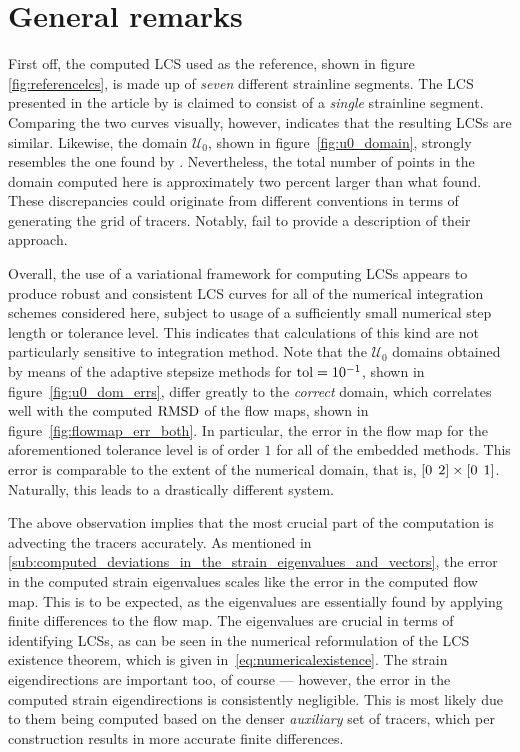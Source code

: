 \section{General remarks}
\label{sec:general_remarks}

First off, the computed LCS used as the reference, shown in figure
\ref{fig:referencelcs}, is made up of \emph{seven} different strainline segments.
The LCS presented in the article by \textcite{farazmand2012computing} is claimed
to consist of a \emph{single} strainline segment. Comparing the two curves
visually, however, indicates that the resulting LCSs are similar. Likewise, the
domain $\mathcal{U}_{0}$, shown in figure~\ref{fig:u0_domain}, strongly
resembles the one found by \citeauthor{farazmand2012computing}. Nevertheless,
the total number of points in the domain computed here is approximately two
percent larger than what \citeauthor{farazmand2012computing} found. These
discrepancies could originate from different conventions in terms of generating
the grid of tracers. Notably, \citeauthor{farazmand2012computing} fail to
provide a description of their approach.

Overall, the use of a variational framework for computing LCSs appears to
produce robust and consistent LCS curves for all of the numerical integration
schemes considered here, subject to usage of a sufficiently small numerical
step length or tolerance level. This indicates that calculations of this kind
are not particularly sensitive to integration method. Note that the
$\mathcal{U}_{0}$ domains obtained by means of the adaptive stepsize methods
for $\textnormal{tol}=10^{-1}$, shown in figure~\ref{fig:u0_dom_errs}, differ
greatly to the \emph{correct} domain, which correlates well with the computed
$\operatorname{RMSD}$ of the flow maps, shown in figure~\ref{fig:flowmap_err_both}. In
particular, the error in the flow map for the aforementioned tolerance level is
of order $1$ for all of the embedded methods. This error is comparable to the
extent of the numerical domain, that is,
$[0\hspace{1ex}2]\times[0\hspace{1ex}1]$. Naturally, this leads to a drastically
different system.

The above observation implies that the most crucial part of the computation is
advecting the tracers accurately. As mentioned in
\cref{sub:computed_deviations_in_the_strain_eigenvalues_and_vectors}, the error
in the computed strain eigenvalues scales like the error in the computed flow
map. This is to be expected, as the eigenvalues are essentially found by
applying finite differences to the flow map. The eigenvalues are crucial in
terms of identifying LCSs, as can be seen in the numerical reformulation of the
LCS existence theorem, which is given in~\cref{eq:numericalexistence}.
The strain eigendirections are important too, of course --- however, the
error in the computed strain eigendirections is consistently negligible.
This is most likely due to them being computed based on the denser
\emph{auxiliary} set of tracers, which per construction results in more accurate
finite differences.

